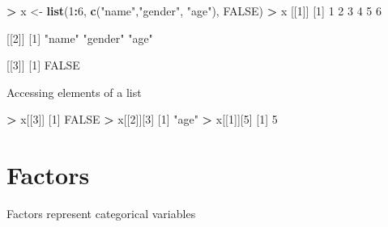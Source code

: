 \documentclass[]{article}
\newenvironment{Shaded}{\begin{snugshade}}{\end{snugshade}}
\newcommand{\KeywordTok}[1]{\textcolor[rgb]{0.13,0.29,0.53}{\textbf{#1}}}
\newcommand{\DecValTok}[1]{\textcolor[rgb]{0.00,0.00,0.81}{#1}}
\newcommand{\StringTok}[1]{\textcolor[rgb]{0.31,0.60,0.02}{#1}}
\newcommand{\OtherTok}[1]{\textcolor[rgb]{0.56,0.35,0.01}{#1}}
\newcommand{\OperatorTok}[1]{\textcolor[rgb]{0.81,0.36,0.00}{\textbf{#1}}}
\newcommand{\NormalTok}[1]{#1}
\begin{document}
\begin{Shaded}
\begin{Highlighting}[]
\OperatorTok{>}\StringTok{ }\NormalTok{x <-}\StringTok{ }\KeywordTok{list}\NormalTok{(}\DecValTok{1}\OperatorTok{:}\DecValTok{6}\NormalTok{, }\KeywordTok{c}\NormalTok{(}\StringTok{"name"}\NormalTok{,}\StringTok{"gender"}\NormalTok{, }\StringTok{"age"}\NormalTok{), }\OtherTok{FALSE}\NormalTok{) }
\OperatorTok{>}\StringTok{ }\NormalTok{x}
\NormalTok{[[}\DecValTok{1}\NormalTok{]]}
\NormalTok{[}\DecValTok{1}\NormalTok{] }\DecValTok{1} \DecValTok{2} \DecValTok{3} \DecValTok{4} \DecValTok{5} \DecValTok{6}

\NormalTok{[[}\DecValTok{2}\NormalTok{]]}
\NormalTok{[}\DecValTok{1}\NormalTok{] }\StringTok{"name"}   \StringTok{"gender"} \StringTok{"age"}   

\NormalTok{[[}\DecValTok{3}\NormalTok{]]}
\NormalTok{[}\DecValTok{1}\NormalTok{] }\OtherTok{FALSE}
\end{Highlighting}
\end{Shaded}

Accessing elements of a list

\begin{Shaded}
\begin{Highlighting}[]
\OperatorTok{>}\StringTok{ }\NormalTok{x[[}\DecValTok{3}\NormalTok{]]}
\NormalTok{[}\DecValTok{1}\NormalTok{] }\OtherTok{FALSE}
\OperatorTok{>}\StringTok{ }\NormalTok{x[[}\DecValTok{2}\NormalTok{]][}\DecValTok{3}\NormalTok{]}
\NormalTok{[}\DecValTok{1}\NormalTok{] }\StringTok{"age"}
\OperatorTok{>}\StringTok{ }\NormalTok{x[[}\DecValTok{1}\NormalTok{]][}\DecValTok{5}\NormalTok{]}
\NormalTok{[}\DecValTok{1}\NormalTok{] }\DecValTok{5}
\end{Highlighting}
\end{Shaded}

\section{Factors}\label{factors}

Factors represent categorical variables
\end{document}
